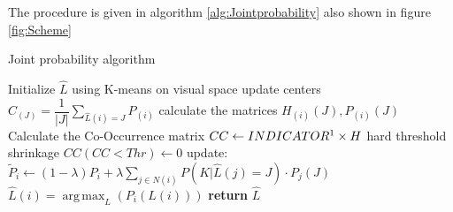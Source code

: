 \documentclass{article}
\DeclareMathOperator*{\argmax}{arg\,max}
\begin{document}
The procedure is given in algorithm \eqref{alg:Jointprobability} also shown in figure \ref{fig:Scheme}

\begin{algorithm}[!h] 
	\caption{Joint probability algorithm}\label{alg:Jointprobability}
	\begin{algorithmic}
		\State Initialize $\hat L$ using K-means on visual space
		\Loop
		\State update centers $C_{(J)}=\dfrac{1}{|J|} \sum_{\widehat{L}(i)=J}^{}P_{(i)}$
		\State calculate the matrices $ H_{(i)}(J),P_{(i)}(J) $
		\State Calculate the Co-Occurrence matrix  $ CC\gets INDICATOR\footnotemark\times H $
		\State hard threshold shrinkage $ CC(CC<Thr)\gets 0 $ 
		\State update: $ \widetilde{P}_i \leftarrow (1-\lambda)P_i + \lambda\sum_{j\in N(i)}^{} P(K|\hat{L}(j)=J)\cdot P_{j}(J) $
		\State $ \hat{L}(i)=\argmax _L(  P_i(L(i))  ) $
		\EndLoop
		\State \textbf{return} $\hat{L}$
		
	\end{algorithmic}
\end{algorithm}

\end{document}
